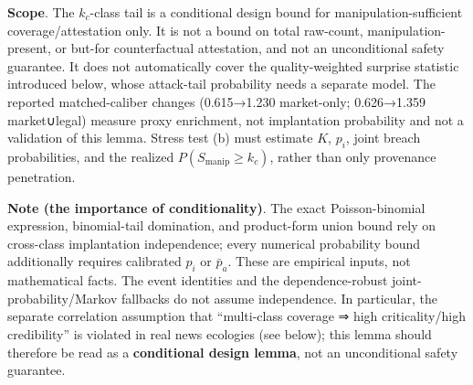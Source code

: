 \documentclass[
  11pt]{article}
\begin{document}
\textbf{Scope}. The \(k_c\)-class tail is a conditional design bound for
manipulation-sufficient coverage/attestation only. It is not a bound on
total raw-count, manipulation-present, or but-for counterfactual
attestation, and not an unconditional safety guarantee. It does not
automatically cover the quality-weighted surprise statistic introduced
below, whose attack-tail probability needs a separate model. The
reported matched-caliber changes (0.615→1.230 market-only; 0.626→1.359
market∪legal) measure proxy enrichment, not implantation probability and
not a validation of this lemma. Stress test (b) must estimate \(K\),
\(p_i\), joint breach probabilities, and the realized
\(P(S_{\mathrm{manip}}\ge k_c)\), rather than only provenance
penetration.

\textbf{Note (the importance of conditionality)}. The exact
Poisson-binomial expression, binomial-tail domination, and product-form
union bound rely on cross-class implantation independence; every
numerical probability bound additionally requires calibrated \(p_i\) or
\(\bar p_a\). These are empirical inputs, not mathematical facts. The
event identities and the dependence-robust joint-probability/Markov
fallbacks do not assume independence. In particular, the separate
correlation assumption that ``multi-class coverage ⇒ high
criticality/high credibility'' is violated in real news ecologies (see
below); this lemma should therefore be read as a \textbf{conditional
design lemma}, not an unconditional safety guarantee.
\end{document}
